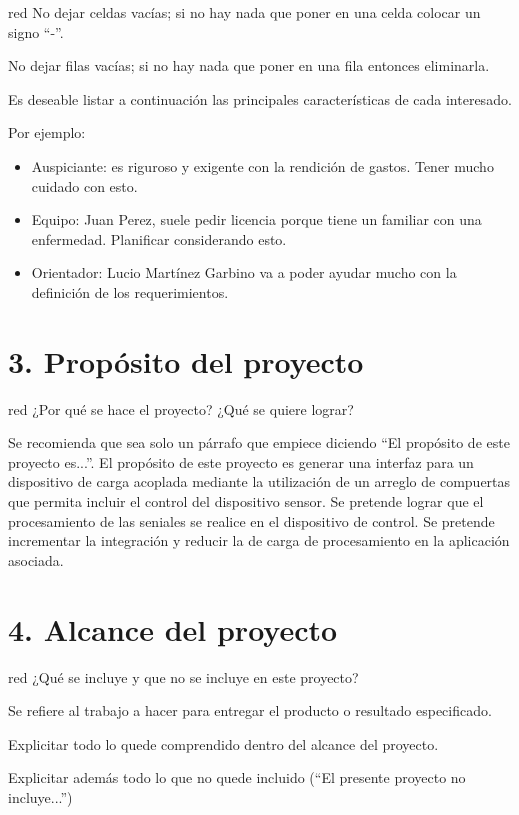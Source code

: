\documentclass[
11pt, %
codirector, %
]{charter}
\begin{document}
\begin{consigna}{red}
No dejar celdas vacías; si no hay nada que poner en una celda colocar un signo ``-''.

No dejar filas vacías; si no hay nada que poner en una fila entonces eliminarla.

Es deseable listar a continuación las principales características de cada interesado.
 
Por ejemplo:
\begin{itemize}
	\item Auspiciante: es riguroso y exigente con la rendición de gastos. Tener mucho cuidado con esto.
	\item Equipo: Juan Perez, suele pedir licencia porque tiene un familiar con una enfermedad. Planificar considerando esto.
	\item Orientador: Lucio Martínez Garbino va a poder ayudar mucho con la definición de los requerimientos.
\end{itemize}

\end{consigna}



\section{3. Propósito del proyecto}
\label{sec:proposito}

\begin{consigna}{red}
¿Por qué se hace el proyecto? ¿Qué se quiere lograr? 

Se recomienda que sea solo un párrafo que empiece diciendo ``El propósito de este proyecto es...''.
El propósito de este proyecto es generar una interfaz para un dispositivo de carga acoplada mediante la utilización de un arreglo de compuertas que permita incluir el control del dispositivo sensor. Se pretende lograr que el procesamiento de las seniales se realice en el dispositivo de control. Se pretende incrementar la integración y reducir la de carga de procesamiento en la aplicación asociada.

\end{consigna}

\section{4. Alcance del proyecto}
\label{sec:alcance}

\begin{consigna}{red}
¿Qué se incluye y que no se incluye en este proyecto?

Se refiere al trabajo a hacer para entregar el producto o resultado especificado. 

Explicitar todo lo quede comprendido dentro del alcance del proyecto.

Explicitar además todo lo que no quede incluido (``El presente proyecto no incluye...'')

\end{consigna}
\end{document}
